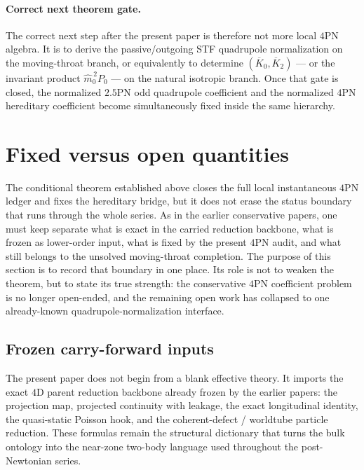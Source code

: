 \documentclass[11pt]{article}
\begin{document}
\paragraph{Correct next theorem gate.}
The correct next step after the present paper is therefore not more local $4$PN
algebra.  It is to derive the passive/outgoing STF quadrupole normalization on
the moving-throat branch, or equivalently to determine $(\overline K_0,
\overline K_2)$ --- or the invariant product $\hat m_0^{\,2}P_0$ --- on the
natural isotropic branch.  Once that gate is closed, the normalized $2.5$PN odd
quadrupole coefficient and the normalized $4$PN hereditary coefficient become
simultaneously fixed inside the same hierarchy.


\section{Fixed versus open quantities}
\label{sec:fixed-open}

The conditional theorem established above closes the full local instantaneous
$4$PN ledger and fixes the hereditary bridge, but it does not erase the status
boundary that runs through the whole series.  As in the earlier conservative
papers, one must keep separate what is exact in the carried reduction backbone,
what is frozen as lower-order input, what is fixed by the present $4$PN audit,
and what still belongs to the unsolved moving-throat completion.  The purpose of
this section is to record that boundary in one place.  Its role is not to weaken
the theorem, but to state its true strength: the conservative $4$PN coefficient
problem is no longer open-ended, and the remaining open work has collapsed to
one already-known quadrupole-normalization interface.

\subsection{Frozen carry-forward inputs}
\label{sec:fixed-open-frozen}

The present paper does not begin from a blank effective theory.  It imports the
exact $4$D parent reduction backbone already frozen by the earlier papers: the
projection map, projected continuity with leakage, the exact longitudinal
identity, the quasi-static Poisson hook, and the coherent-defect / worldtube
particle reduction.  These formulas remain the structural dictionary that turns
the bulk ontology into the near-zone two-body language used throughout the
post-Newtonian series.
\end{document}
